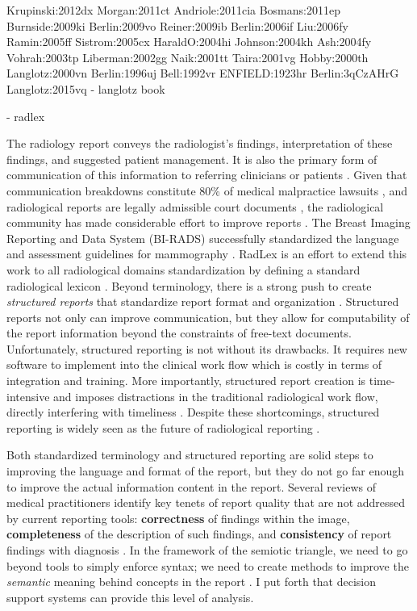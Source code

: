 Krupinski:2012dx
	Morgan:2011ct
	Andriole:2011cia
	Bosmans:2011ep
	Burnside:2009ki
	Berlin:2009vo
	Reiner:2009ib
	Berlin:2006if
	Liu:2006fy
	Ramin:2005ff
	Sistrom:2005cx
	HaraldO:2004hi
	Johnson:2004kh
	Ash:2004fy
	Vohrah:2003tp
	Liberman:2002gg
	Naik:2001tt
	Taira:2001vg
	Hobby:2000th
	Langlotz:2000vn
	Berlin:1996uj
	Bell:1992vr
	ENFIELD:1923hr
	Berlin:3qCzAHrG
	Langlotz:2015vq - langlotz book

\cite{Langlotz:2006jn} - radlex


The radiology report conveys the radiologist's findings, interpretation of these findings, and suggested patient management. It is also the primary form of communication of this information to referring clinicians or patients \cite{Sistrom:2005cx}. Given that communication breakdowns constitute 80\% of medical malpractice lawsuits \cite{Levinson:1994ko}, and radiological reports are legally admissible court documents \cite{Oppenheim:2012tq}, the radiological community has made considerable effort to improve reports \cite{Langlotz:2015vq}. The Breast Imaging Reporting and Data System (BI-RADS) successfully standardized the language and assessment guidelines for mammography \cite{Liberman:ws,Langlotz:2009fn,Burnside:2009ki}. RadLex is an effort to extend this work to all radiological domains standardization by defining a standard radiological lexicon \cite{Langlotz:2006jn}. Beyond terminology, there is a strong push to create \emph{structured reports} that standardize report format and organization \cite{Langlotz:2009dd,Reiner:2009ib}. Structured reports not only can improve communication, but they allow for computability of the report information beyond the constraints of free-text documents. Unfortunately, structured reporting is not without its drawbacks. It requires new software to implement into the clinical work flow which is costly in terms of integration and training. More importantly, structured report creation is time-intensive and imposes distractions in the traditional radiological work flow, directly interfering with timeliness \cite{Weiss:2008er}. Despite these shortcomings, structured reporting is widely seen as the future of radiological reporting \cite{Langlotz:2015vq}.

Both standardized terminology and structured reporting are solid steps to improving the language and format of the report, but they do not go far enough to improve the actual information content in the report. Several reviews of medical practitioners identify key tenets of report quality that are not addressed by current reporting tools: \textbf{correctness} of findings within the image, \textbf{completeness} of the description of such findings, and \textbf{consistency} of report findings with diagnosis \cite{Johnson:2004kh, HaraldO:2004hi, Reiner:2006fa}. In the framework of the semiotic triangle, we need to go beyond tools to simply enforce syntax; we need to create methods to improve the \emph{semantic} meaning behind concepts in the report \cite{Mead:2006wm}. I put forth that decision support systems can provide this level of analysis. 